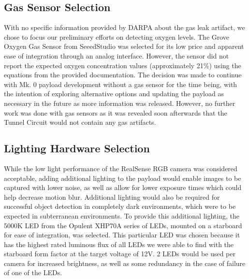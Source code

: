 \subsection{Gas Sensor Selection}

With no specific information provided by DARPA about the gas leak artifact, we chose to focus our preliminary efforts on detecting oxygen levels. The Grove Oxygen Gas Sensor from SeeedStudio was selected for its low price and apparent ease of integration through an analog interface. However, the sensor did not report the expected oxygen concentration values (approximately 21\%) using the equations from the provided documentation. The decision was made to continue with Mk. 0 payload development without a gas sensor for the time being, with the intention of exploring alternative options and updating the payload as necessary in the future as more information was released. However, no further work was done with gas sensors as it was revealed soon afterwards that the Tunnel Circuit would not contain any gas artifacts.

	
\subsection{Lighting Hardware Selection}

While the low light performance of the RealSense RGB camera was considered acceptable, adding additional lighting to the payload would enable images to be captured with lower noise, as well as allow for lower exposure times which could help decrease motion blur. Additional lighting would also be required for successful object detection in completely dark environments, which were to be expected in subterranean environments. To provide this additional lighting, the 5000K LED from the Opulent XHP70A series of LEDs, mounted on a starboard for ease of integration, was selected. This particular LED was chosen because it has the highest rated luminous flux of all LEDs we were able to find with the starboard form factor at the target voltage of 12V. 2 LEDs would be used per camera for increased brightness, as well as some redundancy in the case of failure of one of the LEDs.

